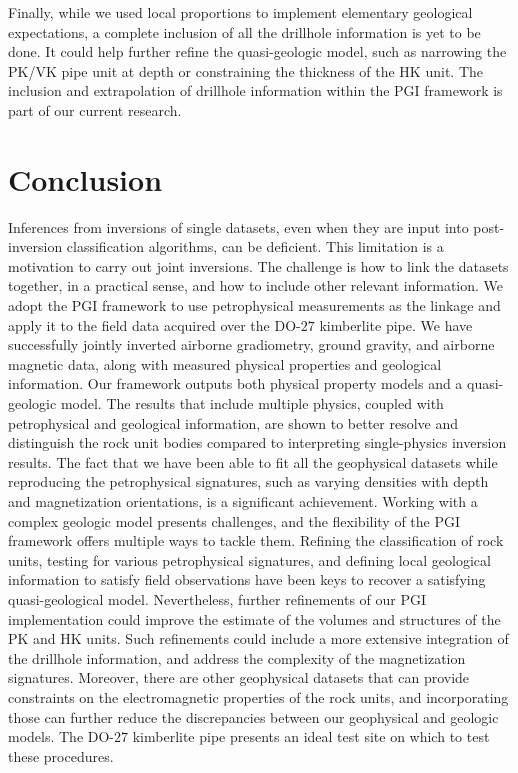\documentclass[paper, twocolumn]{geophysics} %
\begin{document}
Finally, while we used local proportions to implement elementary geological expectations, a complete inclusion of all the drillhole information is yet to be done. It could help further refine the quasi-geologic model, such as narrowing the PK/VK pipe unit at depth or constraining the thickness of the HK unit. The inclusion and extrapolation of drillhole information within the PGI framework is part of our current research.

\section{Conclusion}

Inferences from inversions of single datasets, even when they are input into post-inversion classification algorithms, can be deficient. This limitation is a motivation to carry out joint inversions. The challenge is how to link the datasets together, in a practical sense, and how to include other relevant information. We adopt the PGI framework to use petrophysical measurements as the linkage and apply it to the field data acquired over the DO-$27$ kimberlite pipe. We have successfully jointly inverted airborne gradiometry, ground gravity, and airborne magnetic data, along with measured physical properties and geological information. Our framework outputs both physical property models and a quasi-geologic model. The results that include multiple physics, coupled with petrophysical and geological information, are shown to better resolve and distinguish the rock unit bodies compared to interpreting single-physics inversion results. The fact that we have been able to fit all the geophysical datasets while reproducing the petrophysical signatures, such as varying densities with depth and magnetization orientations, is a significant achievement.
Working with a complex geologic model presents challenges, and the flexibility of the PGI framework offers multiple ways to tackle them. Refining the classification of rock units, testing for various petrophysical signatures, and defining local geological information to satisfy field observations have been keys to recover a satisfying quasi-geological model. Nevertheless, further refinements of our PGI implementation could improve the estimate of the volumes and structures of the PK and HK units. Such refinements could include a more extensive integration of the drillhole information, and address the complexity of the magnetization signatures. Moreover, there are other geophysical datasets that can provide constraints on the electromagnetic properties of the rock units, and incorporating those can further reduce the discrepancies between our geophysical and geologic models. The DO-$27$ kimberlite pipe presents an ideal test site on which to test these procedures.
\end{document}
